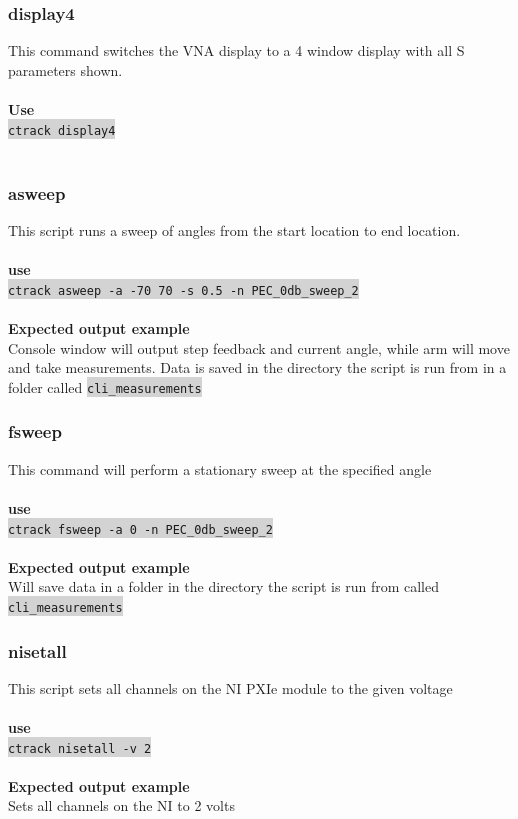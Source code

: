 \documentclass[hidelinks]{article}
\newcommand{\code}[1]{\colorbox{lightgray}{\texttt{#1}}}
\begin{document}
\subsubsection{display4}
This command switches the VNA display to a 4 window display with all S parameters shown.
\\\\\textbf{Use}\\
\code{ctrack display4}\\\\
\subsubsection{asweep}
This script runs a sweep of angles from the start location to end location.
\\\\\textbf{use}\\
\code{ctrack asweep -a -70 70 -s 0.5 -n PEC\_0db\_sweep\_2}\\\\
\textbf{Expected output example}\\
Console window will output step feedback and current angle, while arm will move and take measurements. Data is saved in the directory the script is run from in a folder called \code{cli\_measurements}

\subsubsection{fsweep}
This command will perform a stationary sweep at the specified angle
\\\\\textbf{use}\\
\code{ctrack fsweep -a 0 -n PEC\_0db\_sweep\_2}\\\\
\textbf{Expected output example}\\
Will save data in a folder in the directory the script is run from called \code{cli\_measurements}
\subsubsection{nisetall}
This script sets all channels on the NI PXIe module to the given voltage
\\\\\textbf{use}\\
\code{ctrack nisetall -v 2}\\\\
\textbf{Expected output example}\\
Sets all channels on the NI to 2 volts
\end{document}
